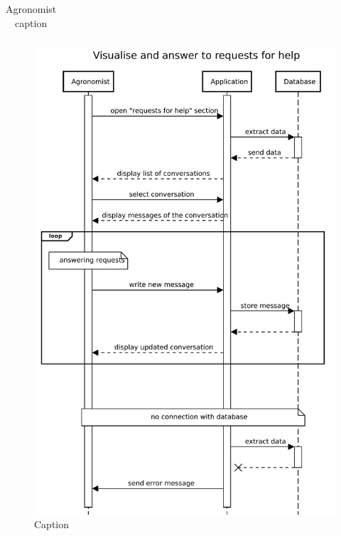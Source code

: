\begin{table}[H]
\begin{tabular}[c]{|l|p{}|}
    \end{tabular}
    \caption{\label{tab:help_request_section_access}Agronomist caption }
\end{table}

\begin{figure}[H]
    \centering
    \includegraphics[scale=0.75]{Images/Sequence diagrams/Agronomist - visualise and answer requests for help.pdf}
    \caption{Caption}
    \label{fig:my_label}
\end{figure}


